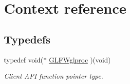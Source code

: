 \hypertarget{group__context}{
\section{Context reference}
\label{group__context}
}
\subsection*{Typedefs}
\begin{CompactItemize}
\item 
typedef void($\ast$ \hyperlink{group__context_gbf42b10edde1c4fc71e212e576b9f811}{GLFWglproc} )(void)
\begin{CompactList}\small\item\em Client API function pointer type. \item\end{CompactList}\end{CompactItemize}
